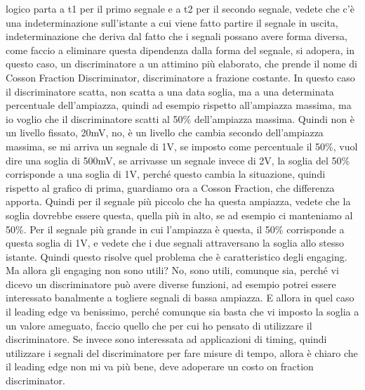 {logico parta a t1 per il primo segnale e a t2 per il secondo segnale, vedete che c'è una indeterminazione sull'istante a cui viene fatto partire il segnale in uscita, indeterminazione che deriva dal fatto che i segnali possano avere forma diversa, come faccio a eliminare questa dipendenza dalla forma del segnale, si adopera, in questo caso, un discriminatore a un attimino più elaborato, che prende il nome di Cosson Fraction Discriminator, discriminatore a frazione costante. In questo caso il discriminatore scatta, non scatta a una data soglia, ma a una determinata percentuale dell'ampiazza, quindi ad esempio rispetto all'ampiazza massima, ma io voglio che il discriminatore scatti al 50\% dell'ampiazza massima. Quindi non è un livello fissato, 20mV, no, è un livello che cambia secondo dell'ampiazza massima, se mi arriva un segnale di 1V, se imposto come percentuale il 50\%, vuol dire una soglia di 500mV, se arrivasse un segnale invece di 2V, la soglia del 50\% corrisponde a una soglia di 1V, perché questo cambia la situazione, quindi rispetto al grafico di prima, guardiamo ora a Cosson Fraction, che differenza apporta. Quindi per il segnale più piccolo che ha questa ampiazza, vedete che la soglia dovrebbe essere questa, quella più in alto, se ad esempio ci manteniamo al 50\%. Per il segnale più grande in cui l'ampiazza è questa, il 50\% corrisponde a questa soglia di 1V, e vedete che i due segnali attraversano la soglia allo stesso istante. Quindi questo risolve quel problema che è caratteristico degli engaging. Ma allora gli engaging non sono utili? No, sono utili, comunque sia, perché vi dicevo un discriminatore può avere diverse funzioni, ad esempio potrei essere interessato banalmente a togliere segnali di bassa ampiazza. E allora in quel caso il leading edge va benissimo, perché comunque sia basta che vi imposto la soglia a un valore ameguato, faccio quello che per cui ho pensato di utilizzare il discriminatore. Se invece sono interessata ad applicazioni di timing, quindi utilizzare i segnali del discriminatore per fare misure di tempo, allora è chiaro che il leading edge non mi va più bene, deve adoperare un costo on fraction discriminator.


}
